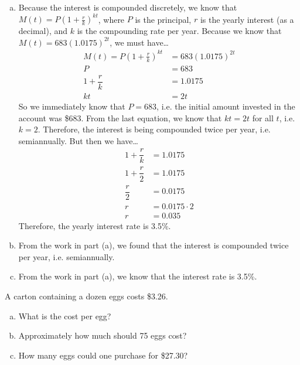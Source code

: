 \documentclass[11pt,letterpaper]{article}
\begin{document}
\sol
\begin{enumerate}[(a)]
\item Because the interest is compounded discretely, we know that $M(t)= P(1 + \frac{r}{k})^{kt}$, where $P$ is the principal, $r$ is the yearly interest (as a decimal), and $k$ is the compounding rate per year. Because we know that $M(t)= 683(1.0175)^{2t}$, we must have\dots
	\[
	\begin{aligned}
	M(t)= P \left( 1 + \frac{r}{k} \right)^{kt}&= 683(1.0175)^{2t} \\
	P&= 683 \\
	1 + \dfrac{r}{k}&= 1.0175 \\
	kt&= 2t
	\end{aligned}
	\]
So we immediately know that $P= 683$, i.e. the initial amount invested in the account was \$683. From the last equation, we know that $kt= 2t$ for all $t$, i.e. $k= 2$. Therefore, the interest is being compounded twice per year, i.e. semiannually. But then we have\dots
	\[
	\begin{aligned}
	1 + \dfrac{r}{k}&= 1.0175 \\[0.3cm]
	1 + \dfrac{r}{2}&= 1.0175 \\[0.3cm]
	\dfrac{r}{2}&= 0.0175 \\[0.3cm]
	r&= 0.0175 \cdot 2 \\[0.3cm]
	r&= 0.035
	\end{aligned}
	\]
Therefore, the yearly interest rate is 3.5\%. \pspace

\item From the work in part (a), we found that the interest is compounded twice per year, i.e. semiannually. \pspace

\item From the work in part (a), we know that the interest rate is 3.5\%. 
\end{enumerate}



\newpage



 A carton containing a dozen eggs costs \$3.26.
\begin{enumerate}[(a)]
\item What is the cost per egg?
\item Approximately how much should 75 eggs cost?
\item How many eggs could one purchase for \$27.30?
\end{enumerate} \pspace
\end{document}

